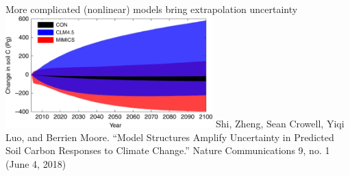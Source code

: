 \documentclass[
  ignorenonframetext,
]{beamer}
\begin{document}
\begin{frame}{More complicated (nonlinear) models bring extrapolation
uncertainty}
\protect\hypertarget{more-complicated-nonlinear-models-bring-extrapolation-uncertainty}{}
\includegraphics[width=0.6\textwidth,height=\textheight]{Zheng_et_al.png}
Shi, Zheng, Sean Crowell, Yiqi Luo, and Berrien Moore. ``Model
Structures Amplify Uncertainty in Predicted Soil Carbon Responses to
Climate Change.'' Nature Communications 9, no. 1 (June 4, 2018)
\end{frame}
\end{document}
